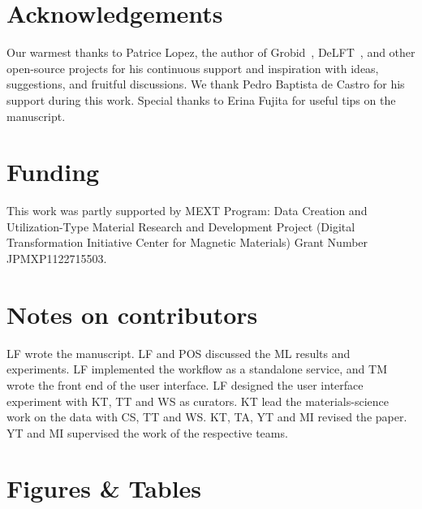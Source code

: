 \documentclass[]{interact}
\theoremstyle{plain} %
\theoremstyle{definition}
\theoremstyle{remark}
\begin{document}
\section*{Acknowledgements}
Our warmest thanks to Patrice Lopez, the author of Grobid~\cite{GROBID}, DeLFT~\cite{DeLFT}, and other open-source projects for his continuous support and inspiration with ideas, suggestions, and fruitful discussions.
We thank Pedro Baptista de Castro for his support during this work. 
Special thanks to Erina Fujita for useful tips on the manuscript. 


\section*{Funding}
This work was partly supported by MEXT Program: Data Creation and Utilization-Type Material Research and Development Project (Digital Transformation Initiative Center for Magnetic Materials) Grant Number JPMXP1122715503.


\section*{Notes on contributors}
LF wrote the manuscript. 
LF and POS discussed the ML results and experiments. 
LF implemented the workflow as a standalone service, and TM wrote the front end of the user interface. 
LF designed the user interface experiment with KT, TT and WS as curators.
KT lead the materials-science work on the data with CS, TT and WS.
KT, TA, YT and MI revised the paper.
YT and MI supervised the work of the respective teams. 





\section*{Figures \& Tables}
\end{document}
